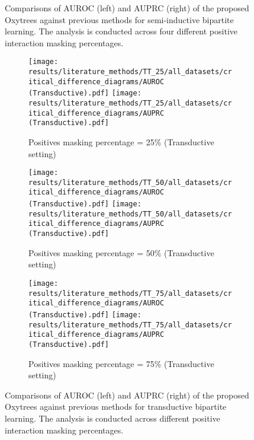 \documentclass[sn-mathphys-num]{sn-jnl}%
\theoremstyle{thmstyleone}%
\theoremstyle{thmstyletwo}%
\theoremstyle{thmstylethree}%
\begin{document}
\begin{appendices}
\begin{figure}[tbh]
    \caption{Comparisons of AUROC (left) and AUPRC (right) of the proposed Oxytrees against previous methods for semi-inductive bipartite learning. The analysis is conducted across four different positive interaction masking percentages.}
    \label{fig:literature semi-inductive}
\end{figure}

\begin{figure}[tbh]
    \centering
    \begin{subfigure}{\textwidth}
        \texttt{[image: results/literature\_methods/TT\_25/all\_datasets/critical\_difference\_diagrams/AUROC (Transductive).pdf]}
        \hfill
        \texttt{[image: results/literature\_methods/TT\_25/all\_datasets/critical\_difference\_diagrams/AUPRC (Transductive).pdf]}
        \caption{Positives masking percentage = 25\% (Transductive setting)}
    \end{subfigure}
    
    \begin{subfigure}{\textwidth}
        \texttt{[image: results/literature\_methods/TT\_50/all\_datasets/critical\_difference\_diagrams/AUROC (Transductive).pdf]}
        \hfill
        \texttt{[image: results/literature\_methods/TT\_50/all\_datasets/critical\_difference\_diagrams/AUPRC (Transductive).pdf]}
        \caption{Positives masking percentage = 50\% (Transductive setting)}
    \end{subfigure}
    
    \begin{subfigure}{\textwidth}
        \texttt{[image: results/literature\_methods/TT\_75/all\_datasets/critical\_difference\_diagrams/AUROC (Transductive).pdf]}
        \hfill
        \texttt{[image: results/literature\_methods/TT\_75/all\_datasets/critical\_difference\_diagrams/AUPRC (Transductive).pdf]}
        \caption{Positives masking percentage = 75\% (Transductive setting)}
    \end{subfigure}   

    \caption{Comparisons of AUROC (left) and AUPRC (right) of the proposed Oxytrees against previous methods for transductive bipartite learning. The analysis is conducted across different positive interaction masking percentages.}
    \label{fig:literature transductive}
\end{figure}




\end{appendices}
\end{document}
